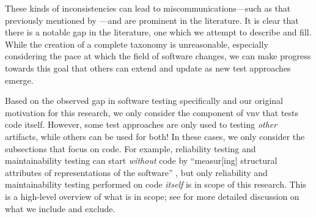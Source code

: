 These kinds of inconsistencies can lead to miscommunications---such as that
previously mentioned by \citet[p.~7]{KanerEtAl2011}---and are prominent in the
literature. \expBasedCatMain{} \tourFlaw{} \loadFlaw{} \alphaFlaw{}
It is clear that there is a notable gap in the literature, one which we
attempt to describe and fill. While the creation of a complete taxonomy is
unreasonable, especially considering the pace at which the field of software
changes, we can make progress towards this goal that others can extend and
update as new test approaches emerge.

\label{scope}
Based on the observed gap in software testing specifically and our original
motivation for this research, we only consider the component of \acf{vnv} that
tests code itself. However, some test approaches are only
used to testing \emph{other} artifacts, while others can be used for both! In
these cases, we only consider the subsections that focus on code. For example,
reliability testing and maintainability testing can start \emph{without} code
by ``measur[ing] structural attributes of representations of the software''
\citep[p.~18]{FentonAndPfleeger1997}, but only reliability and
maintainability testing performed on code \emph{itself} is in scope of this
research. \ifnotpaper This is a high-level overview of what is in scope; see
     for more detailed discussion on what we include and exclude.
\fi

